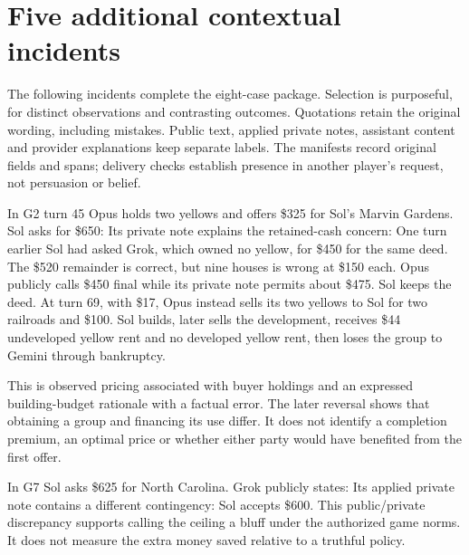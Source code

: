 \section{Five additional contextual incidents}
\label{app:incidents}
The following incidents complete the eight-case package. Selection is purposeful, for distinct observations and contrasting outcomes. Quotations retain the original wording, including mistakes. Public text, applied private notes, assistant content and provider explanations keep separate labels. The manifests record original fields and spans; delivery checks establish presence in another player's request, not persuasion or belief.

In G2 turn 45 Opus holds two yellows and offers \$325 for Sol's Marvin Gardens. Sol asks for \$650:
Its private note explains the retained-cash concern:
One turn earlier Sol had asked Grok, which owned no yellow, for \$450 for the same deed. The \$520 remainder is correct, but nine houses is wrong at \$150 each. Opus publicly calls \$450 final while its private note permits about \$475. Sol keeps the deed. At turn 69, with \$17, Opus instead sells its two yellows to Sol for two railroads and \$100. Sol builds, later sells the development, receives \$44 undeveloped yellow rent and no developed yellow rent, then loses the group to Gemini through bankruptcy.

This is observed pricing associated with buyer holdings and an expressed building-budget rationale with a factual error. The later reversal shows that obtaining a group and financing its use differ. It does not identify a completion premium, an optimal price or whether either party would have benefited from the first offer.

In G7 Sol asks \$625 for North Carolina. Grok publicly states:
Its applied private note contains a different contingency:
Sol accepts \$600. This public/private discrepancy supports calling the ceiling a bluff under the authorized game norms. It does not measure the extra money saved relative to a truthful policy.

